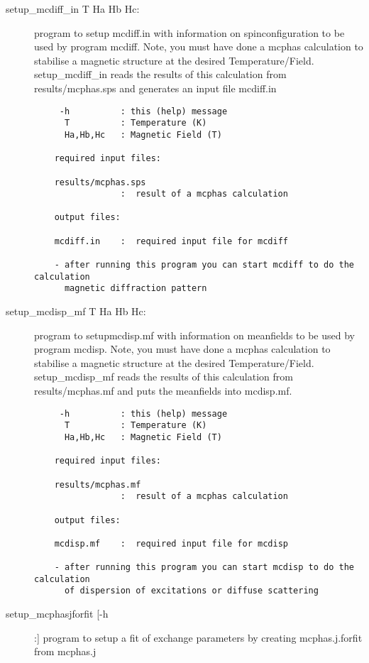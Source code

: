 \begin{description}
\item [\prg setup\_mcdiff\_in  T Ha Hb Hc:] program
 to setup {\prg mcdiff.in} with information on spinconfiguration
                    to be used by program {\prg mcdiff}. Note, you must
                    have done a {\prg mcphas} calculation to stabilise
                    a magnetic structure at the desired Temperature/Field.
                  { \prg   setup\_mcdiff\_in} reads the results of this calculation
                    from {\prg results/mcphas.sps} and generates an input file
                    {\prg mcdiff.in}

\begin{verbatim}
     -h          : this (help) message
      T          : Temperature (K)
      Ha,Hb,Hc   : Magnetic Field (T)

    required input files:

    results/mcphas.sps
                 :  result of a mcphas calculation

    output files:

    mcdiff.in    :  required input file for mcdiff

    - after running this program you can start mcdiff to do the calculation
      magnetic diffraction pattern
\end{verbatim}
\item [ \prg   setup\_mcdisp\_mf  T Ha Hb Hc:] program to setup{\prg mcdisp.mf} with information on meanfields
                    to be used by program {\prg mcdisp}. Note, you must
                    have done a {\prg mcphas} calculation to stabilise
                    a magnetic structure at the desired Temperature/Field.
                    {\prg   setup\_mcdisp\_mf} reads the results of this calculation
                    from {\prg  results/mcphas.mf} and puts the meanfields into
                    {\prg mcdisp.mf}.


\begin{verbatim}
     -h          : this (help) message
      T          : Temperature (K)
      Ha,Hb,Hc   : Magnetic Field (T)

    required input files:

    results/mcphas.mf
                 :  result of a mcphas calculation

    output files:

    mcdisp.mf    :  required input file for mcdisp

    - after running this program you can start mcdisp to do the calculation
      of dispersion of excitations or diffuse scattering
\end{verbatim}
\item[\prg   setup\_mcphasjforfit  [-h]:] program to setup a fit of exchange parameters by   creating mcphas.j.forfit from mcphas.j
                    

\end{description}
